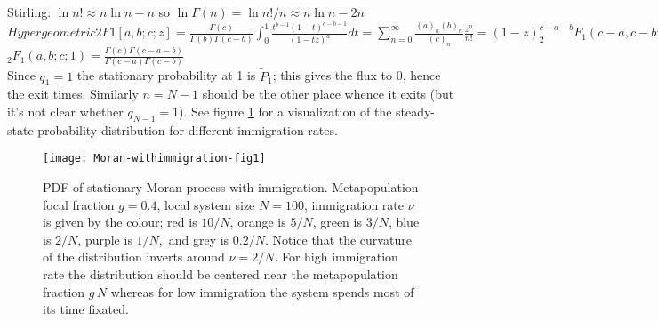 Stirling: $\ln n! \approx n \ln n - n$ so $\ln \Gamma(n) = \ln n!/n \approx n\ln n - 2n$ \\
$Hypergeometric2F1[a,b;c;z] = \frac{\Gamma(c)}{\Gamma(b)\Gamma(c-b)} \int_0^1 \frac{t^{b-1}(1-t)^{c-b-1}}{(1-t z)^{a}}dt = \sum_{n=0}^\infty \frac{(a)_n (b)_n}{(c)_n}\frac{z^n}{n!} = (1-z)^{c-a-b} _{2}F_1(c-a,c-b;c;z)$ \\
$_2F_1(a,b;c;1) = \frac{\Gamma(c)\Gamma(c-a-b)}{\Gamma(c-a)\Gamma(c-b)}$ \\
Since $q_1=1$ the stationary probability at 1 is $\widetilde{P}_1$; this gives the flux to 0, hence the exit times. 
Similarly $n=N-1$ should be the other place whence it exits (but it's not clear whether $q_{N-1}=1$). 
\fi
See figure \ref{stationary-fig2} for a visualization of the steady-state probability distribution for different immigration rates. %
\setlength{\unitlength}{1.0cm}
\begin{figure}[ht]
	\centering
	\texttt{[image: Moran-withimmigration-fig1]}
	\caption{PDF of stationary Moran process with immigration. Metapopulation focal fraction $g=0.4$, local system size $N=100$, immigration rate $\nu$ is given by the colour; red is $10/N$, orange is $5/N$, green is $3/N$, blue is $2/N$, purple is $1/N,$ and grey is $0.2/N$. Notice that the curvature of the distribution inverts around $\nu=2/N$. For high immigration rate the distribution should be centered near the metapopulation fraction $g\,N$ whereas for low immigration the system spends most of its time fixated. } \label{stationary-fig2}
\end{figure}

